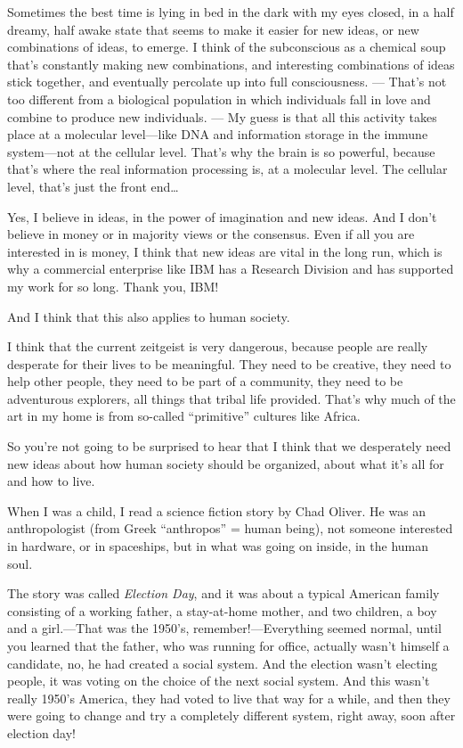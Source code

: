 \documentclass[12pt]{book}
\begin{document}
Sometimes the best time is lying in bed in the dark with my eyes closed,
in a half dreamy, half awake state that seems
to make it easier for new ideas, or new combinations of ideas, to emerge.
I think of the subconscious as a chemical soup that's constantly making new combinations,
and interesting combinations of ideas stick together, and eventually percolate up into 
full consciousness. --- That's not too different from a biological population in which
individuals fall in love and combine to produce new
individuals. --- My guess is that all this activity 
takes place at a molecular level---like DNA
and information storage in the immune system---not at the cellular level. That's why the
brain is so powerful, because that's where the real information processing is, at a
molecular level. The cellular level, that's just the front end\ldots
 
Yes, I believe in ideas, in the power of imagination and new ideas.  And I don't believe in
money or in majority views or the consensus.  Even if all you are interested in is money, I 
think that new ideas are vital in the long run, which is why a commercial enterprise like IBM
has a Research Division and has supported my work for so long.
Thank you, IBM!
 
And I think that this also applies to human society.  
 
I think that the current zeitgeist is  very dangerous, because people are really desperate
for their lives to be meaningful. They need to be creative, they need to help other people,
they need to be part of a community, they need to be adventurous explorers, all things that
tribal life provided.
That's why much of the art in my home is from so-called ``primitive'' cultures like Africa.
 
So you're not going to be surprised to hear that I think 
that we desperately need new ideas about how human society should be organized,
about what it's all for and how to live.
 
When I was a child, I read a science fiction story by Chad Oliver.
He was an anthropologist (from Greek ``anthropos'' = human being), 
not someone interested in hardware, or in spaceships,
but in what was going on inside, in the human soul.
 
The story was called \emph{Election Day}, and it was about a typical American family consisting of
a working father, a stay-at-home mother, and two children, a boy and a girl.---That was the 1950's,
remember!---Everything seemed normal, 
until you learned that the father, who was running for office,
actually wasn't himself a candidate, no, he had created a social system.  And the election wasn't
electing people, it was voting on the choice of the next social system.  And this wasn't
really 1950's America, they had voted to live that way for a while, and then they were going
to change and try a completely different system, right away, soon after election day!
 
\end{document}
